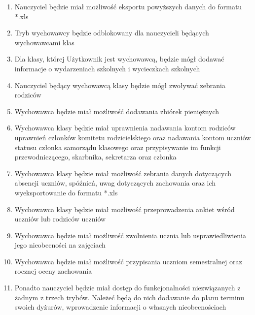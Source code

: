 \documentclass{article}
\begin{document}
\begin{enumerate}
  \item Nauczyciel będzie miał możliwość eksportu powyższych danych do formatu *.xls
  \item Tryb wychowawcy będzie odblokowany dla nauczycieli będących wychowawcami klas
  \item Dla klasy, której Użytkownik jest wychowawcą, będzie mógł dodawać informacje o wydarzeniach szkolnych i wycieczkach szkolnych
  \item Nauczyciel będący wychowawcą klasy będzie mógł zwoływać zebrania rodziców
  \item Wychowawca będzie miał możliwość dodawania zbiórek pieniężnych
  \item Wychowawca klasy będzie miał uprawnienia nadawania kontom rodziców uprawnień członków komitetu rodzicielskiego oraz nadawania kontom uczniów statusu członka samorządu klasowego oraz przypisywanie im funkcji przewodniczącego, skarbnika, sekretarza oraz członka
  \item Wychowawca klasy będzie miał możliwość zebrania danych dotyczących absencji uczniów, spóźnień, uwag dotyczących zachowania oraz ich wyeksportowanie do formatu *.xls
  \item Wychowawca klasy będzie miał możliwość przeprowadzenia ankiet wśród uczniów lub rodziców uczniów
  \item Wychowawca będzie miał możliwość zwolnienia ucznia lub usprawiedliwienia jego nieobecności na zajęciach
  \item Wychowawca będzie miał możliwość przypisania uczniom semestralnej oraz rocznej oceny zachowania
  \item Ponadto nauczyciel będzie miał dostęp do funkcjonalności niezwiązanych z żadnym z trzech trybów. Należeć będą do nich dodawanie do planu terminu swoich dyżurów, wprowadzenie informacji o własnych nieobecnościach
\end{enumerate}
\end{document}
